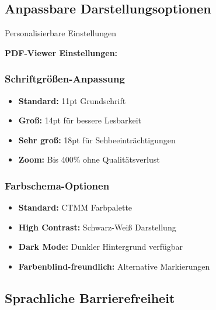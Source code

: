 \subsection{Anpassbare Darstellungsoptionen}

\begin{ctmmGreenBox}{Personalisierbare Einstellungen}

\textbf{PDF-Viewer Einstellungen:}

\subsubsection{Schriftgrößen-Anpassung}
\begin{itemize}
  \item \textbf{Standard:} 11pt Grundschrift
  \item \textbf{Groß:} 14pt für bessere Lesbarkeit
  \item \textbf{Sehr groß:} 18pt für Sehbeeinträchtigungen
  \item \textbf{Zoom:} Bis 400\% ohne Qualitätsverlust
\end{itemize}

\subsubsection{Farbschema-Optionen}
\begin{itemize}
  \item \textbf{Standard:} CTMM Farbpalette
  \item \textbf{High Contrast:} Schwarz-Weiß Darstellung
  \item \textbf{Dark Mode:} Dunkler Hintergrund verfügbar
  \item \textbf{Farbenblind-freundlich:} Alternative Markierungen
\end{itemize}

\end{ctmmGreenBox}

\subsection{Sprachliche Barrierefreiheit}

